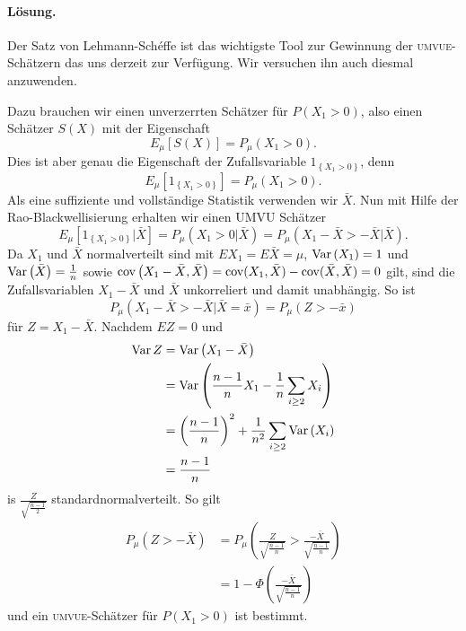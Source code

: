 \paragraph*{Lösung.} Der Satz von Lehmann-Sch\'effe ist das wichtigste Tool
zur Gewinnung der \textsc{umvue}-Schätzern das uns derzeit zur Verfügung. Wir
versuchen ihn auch diesmal anzuwenden. 

Dazu brauchen wir einen unverzerrten Schätzer für $P\left( X_1 >0 \right)$, also einen
Schätzer $S(X)$ mit der Eigenschaft
\begin{equation*}
	E_\mu \left[ S(X) \right] = P_\mu(X_1 > 0).
\end{equation*}
Dies ist aber genau die Eigenschaft der Zufallsvariable $1_{ \left\{ X_1 > 0 \right\}  }$, denn
\begin{equation*}
	E_\mu \left[   1_{ \left\{ X_1 > 0 \right\}  }  \right] = P_\mu( X_1 > 0).
\end{equation*}
Als eine suffiziente und vollständige Statistik verwenden wir $\bar X$. Nun mit
Hilfe der Rao-Blackwellisierung erhalten wir einen \textsc{UMVU} Schätzer
\begin{equation*}
	E_\mu \left[ 1_{ \left\{ X_1 > 0 \right\}  } | \bar X \right]
	= P_\mu \left( X_1 > 0 | \bar X \right) 
	= P_\mu \left( X_1 - \bar X > -\bar X | \bar X \right).
\end{equation*}
Da $X_1$ und $\bar X$ normalverteilt sind mit $E X_1 = E \bar X = \mu$, 
$\operatorname{Var} \left( X_1 \right)=1$ und $\operatorname{Var}\left( \bar X \right) = \frac{1}{n}$ sowie
$\operatorname{cov} \left( X_1- \bar X, \bar X \right) = \operatorname{cov}(X_1, \bar X) - \operatorname{cov}(\bar X, \bar X) = 0$ gilt, 
sind die Zufallsvariablen $X_1 - \bar X$ und $\bar X$ unkorreliert und damit unabhängig. 
So ist
\begin{equation*}
	P_\mu \left( X_1 - \bar X > -\bar X | \bar X = \bar x \right) = P_\mu \left( Z > -\bar x  \right)
\end{equation*}
für $Z=X_1 - \bar X$. Nachdem $EZ=0$ und 
\begin{align*}
	\operatorname{Var} Z &= \operatorname{Var} \left( X_1- \bar X \right) \\
	&= \operatorname{Var} \left( \frac{n-1}{n} X_1 - \frac{1}{n} \sum_{i\geq 2}^{} X_i  \right) \\
	&= \left( \frac{n-1}{n} \right)^2 + \frac{1}{n^2} \sum_{i\geq 2}^{} \operatorname{Var} \left( X_i  \right) \\
	&= \frac{n-1}{ n}
\end{align*}
is $\frac{Z}{\sqrt{\frac{n-1}{2}}}$ standardnormalverteilt. So gilt
\begin{align*}
	P_\mu \left( Z > -\bar X \right) &= 
	P_\mu \left(  \frac{Z}{ \sqrt{\frac{n-1}{n}} } > \frac{-\bar X}{ \sqrt{\frac{n-1}{n}}   } \right) \\
	&= 1- \Phi\left( \frac{-\bar X}{ \sqrt{\frac{n-1}{n}}}    \right) 
\end{align*}
und ein \textsc{umvue}-Schätzer für $P\left( X_1 >0 \right)$ ist bestimmt.




